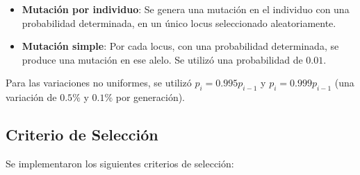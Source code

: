 \documentclass[letterpaper,twocolumn,10pt]{article}
\begin{document}
\begin{itemize}
    \item \textbf{Mutación por individuo}: Se genera una mutación en el individuo con una
        probabilidad determinada, en un único locus seleccionado aleatoriamente.
    \item \textbf{Mutación simple}: Por cada locus, con una probabilidad
        determinada, se produce una mutación en ese alelo. Se utilizó una
        probabilidad de $0.01$.
\end{itemize}

Para las variaciones no uniformes, se utilizó $p_i = 0.995p_{i-1}$ y  $p_i = 0.999p_{i-1}$
(una variación de $0.5\%$ y $0.1\%$ por generación).

\subsection{Criterio de Selección}

Se implementaron los siguientes criterios de selección:
\end{document}
